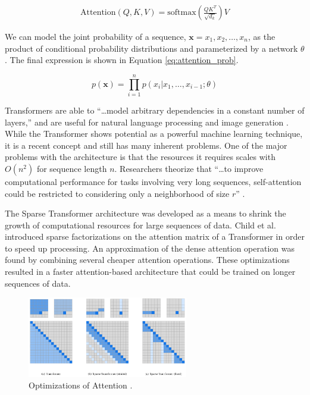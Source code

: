 \documentclass[letterpaper]{article} %
\begin{document}
\begin{equation}
\label{eq:attention}
\begin{split}
\text{Attention}(Q,K,V) = \text{softmax}(\frac{QK^T}{\sqrt{d_k}})V
\end{split}
\end{equation}

We can model the joint probability of a sequence,
$\mathbf{x}={x_1,x_2,\dots,x_n}$,
as the product of conditional
probability distributions and parameterized by a network $\theta$
\cite{generative_transformers}.
The final expression is shown in Equation \ref{eq:attention_prob}.

\begin{equation}
\label{eq:attention_prob}
p(\mathbf{x}) = \prod_{i=1}^{n}p(x_i|x_1,\dots,x_{i-1};\theta)
\end{equation}

Transformers are able to
``\dots model arbitrary dependencies
in a constant number of layers,''
and are useful for natural language processing and image generation
\cite{generative_transformers}.
While the Transformer shows potential as a powerful machine learning technique,
it is a recent concept and still has many inherent problems.
One of the major problems with the architecture
is that the resources it requires scales with $O(n^2)$
for sequence length $n$. Researchers theorize that
``\dots to improve computational performance for tasks involving very long sequences,
self-attention could be restricted to considering only a neighborhood of size $r$''
\cite{attention_need}.

The Sparse Transformer architecture was developed as a means to shrink the
growth of computational resources for large sequences of data.
Child et al. introduced sparse factorizations on the attention matrix
of a Transformer in order to speed up processing.
An approximation of the dense attention
operation was found by combining several cheaper attention operations.
These optimizations resulted in a faster attention-based architecture
that could be trained on longer sequences of data.

\begin{figure}[htbp]
\centerline{\includegraphics[width=7cm]{attention_comparison.png}}
\caption{Optimizations of Attention
\cite{generative_transformers}.}
\label{fig:attention_optimization}
\end{figure}
\end{document}
